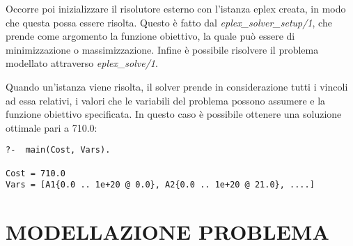 \documentclass[12pt,a4paper,openright,twoside]{report}
\begin{document}
Occorre poi inizializzare il risolutore esterno con l'istanza eplex creata, in modo che questa possa essere risolta. Questo è fatto dal \emph{eplex\_solver\_setup/1}, che prende come argomento la funzione obiettivo, la quale può essere di minimizzazione o massimizzazione. Infine è possibile risolvere il problema modellato attraverso \emph{eplex\_solve/1}.

Quando un'istanza viene risolta, il solver prende in considerazione tutti i vincoli ad essa relativi, i valori che le variabili del problema possono assumere e la funzione obiettivo specificata. In questo caso è possibile ottenere una soluzione ottimale pari a 710.0: 
\begin{lstlisting}
?-	main(Cost, Vars).

Cost = 710.0
Vars = [A1{0.0 .. 1e+20 @ 0.0}, A2{0.0 .. 1e+20 @ 21.0}, ....]
\end{lstlisting}

\section{MODELLAZIONE PROBLEMA}
\end{document}
